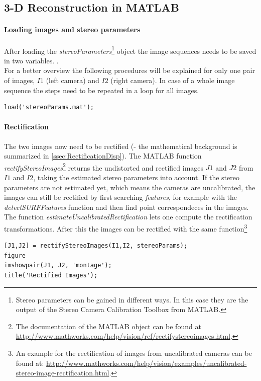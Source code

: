\subsection{3-D Reconstruction in MATLAB}\label{ssec:ReconstrMatlab}
\paragraph{Loading images and stereo parameters}
After loading the \textit{stereoParameters}\footnote{Stereo parameters can be gained in different ways. In this case they are the output of the Stereo Camera Calibration Toolbox from MATLAB.} object the image sequences needs to be saved in two variables. .\\
For a better overview the following procedures will be explained for only one pair of images, $I1$ (left camera) and $I2$ (right camera). In case of a whole image sequence the steps need to be repeated in a loop for all images.
\begin{lstlisting}[caption={Load stereoParams and images}]
 load('stereoParams.mat');
\end{lstlisting}

\paragraph{Rectification}
The two images now need to be rectified (- the mathematical background is summarized in \autoref{ssec:RectificationDisp}). The MATLAB function \textit{rectifyStereoImages}\footnote{The documentation of the MATLAB object can be found at \url{http://www.mathworks.com/help/vision/ref/rectifystereoimages.html}.} returns the undistorted and rectified images $J1$ and $J2$ from $I1$ and $I2$, taking the estimated stereo parameters into account. If the stereo parameters are not estimated yet, which means the cameras are uncalibrated, the images can still be rectified by first searching \textit{features}, for example with the \textit{detectSURFFeatures} function and then find point correspondeces in the images. The function \textit{estimateUncalibratedRectification} lets one compute the rectification transformations. After this the images can be rectified with the same function\footnote{An example for the rectification of images from uncalibrated cameras can be found at: \url{http://www.mathworks.com/help/vision/examples/uncalibrated-stereo-image-rectification.html}.} 

\begin{lstlisting}[caption={Image rectification.}]
[J1,J2] = rectifyStereoImages(I1,I2, stereoParams);
figure
imshowpair(J1, J2, 'montage');
title('Rectified Images');
\end{lstlisting}

